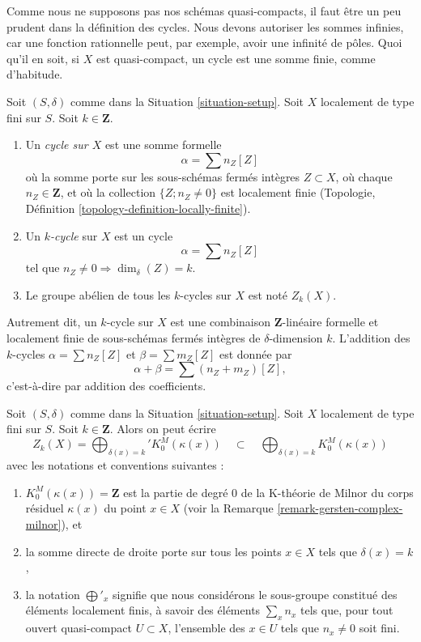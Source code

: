 \noindent
Comme nous ne supposons pas nos schémas quasi-compacts, il faut
être un peu prudent dans la définition des cycles. Nous devons autoriser
les sommes infinies, car une fonction rationnelle peut, par exemple, avoir une infinité de
pôles. Quoi qu'il en soit, si $X$ est quasi-compact, un
cycle est une somme finie, comme d'habitude.

\begin{definition}
\label{definition-cycles}
Soit $(S, \delta)$ comme dans la Situation \ref{situation-setup}.
Soit $X$ localement de type fini sur $S$.
Soit $k \in \mathbf{Z}$.
\begin{enumerate}
\item Un {\it cycle sur $X$} est une somme formelle
$$
\alpha = \sum n_Z [Z]
$$
où la somme porte sur les sous-schémas fermés intègres $Z \subset X$,
où chaque $n_Z \in \mathbf{Z}$, et où la collection
$\{Z; n_Z \not = 0\}$ est localement finie
(Topologie, Définition \ref{topology-definition-locally-finite}).
\item Un {\it $k$-cycle} sur $X$ est un cycle
$$
\alpha = \sum n_Z [Z]
$$
tel que $n_Z \not = 0 \Rightarrow \dim_\delta(Z) = k$.
\item Le groupe abélien de tous les $k$-cycles sur $X$ est noté $Z_k(X)$.
\end{enumerate}
\end{definition}

\noindent
Autrement dit, un $k$-cycle sur $X$
est une combinaison $\mathbf{Z}$-linéaire formelle et localement finie
de sous-schémas fermés intègres de $\delta$-dimension $k$.
L'addition des $k$-cycles $\alpha = \sum n_Z[Z]$ et
$\beta = \sum m_Z[Z]$ est donnée par
$$
\alpha + \beta = \sum (n_Z + m_Z)[Z],
$$
c'est-à-dire par addition des coefficients.

\begin{remark}
\label{remark-cycles-pointwise}
Soit $(S, \delta)$ comme dans la Situation \ref{situation-setup}.
Soit $X$ localement de type fini sur $S$. Soit $k \in \mathbf{Z}$.
Alors on peut écrire
$$
Z_k(X) = \bigoplus\nolimits_{\delta(x) = k}' K_0^M(\kappa(x))
\quad\subset\quad
\bigoplus\nolimits_{\delta(x) = k} K_0^M(\kappa(x))
$$
avec les notations et conventions suivantes :
\begin{enumerate}
\item $K_0^M(\kappa(x)) = \mathbf{Z}$ est la partie de degré $0$ de
la K-théorie de Milnor du corps résiduel $\kappa(x)$ du point
$x \in X$ (voir la Remarque \ref{remark-gersten-complex-milnor}), et
\item la somme directe de droite porte sur tous les points $x \in X$
tels que $\delta(x) = k$,
\item la notation $\bigoplus'_x$ signifie que nous considérons le
sous-groupe constitué des éléments localement finis, à savoir des éléments
$\sum_x n_x$ tels que, pour tout ouvert quasi-compact $U \subset X$,
l'ensemble des $x \in U$ tels que $n_x \not = 0$ soit fini.
\end{enumerate}
\end{remark}

